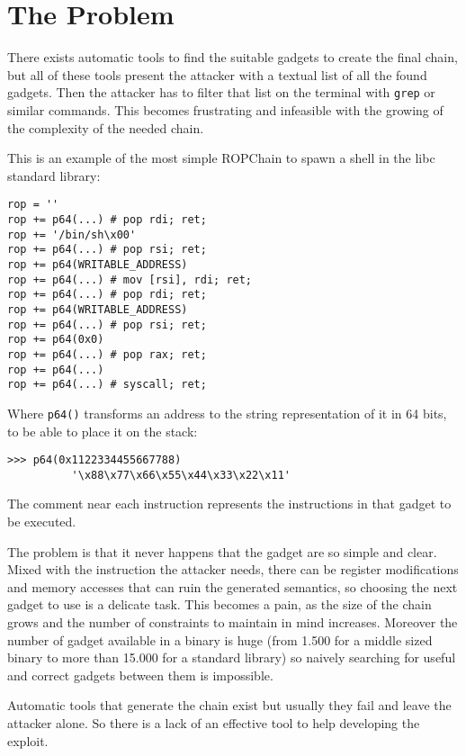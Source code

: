 \documentclass[twocolumn, 11pt]{article}
\begin{document}
\section{The Problem}
There exists automatic tools to find the suitable gadgets to create the final chain, but all of these tools present the attacker with a textual list of all the found gadgets. Then the attacker has to filter that list on the terminal with \texttt{grep} or similar commands. This becomes frustrating and infeasible with the growing of the complexity of the needed chain.

This is an example of the most simple ROPChain to spawn a shell in the libc standard library:

\begin{lstlisting}
rop = ''
rop += p64(...) # pop rdi; ret;
rop += '/bin/sh\x00'
rop += p64(...) # pop rsi; ret;
rop += p64(WRITABLE_ADDRESS)
rop += p64(...) # mov [rsi], rdi; ret;
rop += p64(...) # pop rdi; ret;
rop += p64(WRITABLE_ADDRESS)
rop += p64(...) # pop rsi; ret;
rop += p64(0x0)
rop += p64(...) # pop rax; ret;
rop += p64(...)
rop += p64(...) # syscall; ret;
\end{lstlisting}

\bigskip
Where \texttt{p64()} transforms an address to the string representation of it in 64 bits, to be able to place it on the stack:
\begin{lstlisting}
>>> p64(0x1122334455667788)
          '\x88\x77\x66\x55\x44\x33\x22\x11'
\end{lstlisting}

The comment near each instruction represents the instructions in that gadget to be executed.

\bigskip
The problem is that it never happens that the gadget are so simple and clear. Mixed with the instruction the attacker needs, there can be register modifications and memory accesses that can ruin the generated semantics, so choosing the next gadget to use is a delicate task. This becomes a pain, as the size of the chain grows and the number of constraints to maintain in mind increases.
Moreover the number of gadget available in a binary is huge (from 1.500 for a middle sized binary to more than 15.000 for a standard library) so naively searching for useful and correct gadgets between them is impossible.

 Automatic tools that generate the chain exist but usually they fail and leave the attacker alone. So there is a lack of an effective tool to help developing the exploit.
\end{document}
